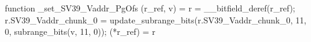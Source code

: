 function _set_SV39_Vaddr_PgOfs (r_ref, v) = {
    r = __bitfield_deref(r_ref);
    r.SV39_Vaddr_chunk_0 = update_subrange_bits(r.SV39_Vaddr_chunk_0, 11, 0, subrange_bits(v, 11, 0));
    (*r_ref) = r
}
